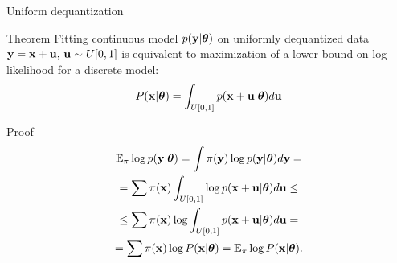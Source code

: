 \begin{frame}{Uniform dequantization}
	\begin{block}{Theorem}
		Fitting continuous model $p(\mathbf{y} | \boldsymbol{\theta})$ on uniformly dequantized data $\mathbf{y} = \mathbf{x} + \mathbf{u}, \, \mathbf{u} \sim U[0, 1]$ is equivalent to maximization of a lower bound on log-likelihood for a discrete model:
		\vspace{-0.2cm}
		\[
		P(\mathbf{x} | \boldsymbol{\theta}) = \int_{U[0, 1]} p(\mathbf{x} + \mathbf{u} | \boldsymbol{\theta}) d \mathbf{u}
		\]
		\vspace{-0.5cm} 
	\end{block}
	\begin{block}{Proof}
		\vspace{-0.8cm}
		\begin{multline*}
			\mathbb{E}_{\pi} \log p(\mathbf{y} | \boldsymbol{\theta}) = \int \pi(\mathbf{y}) \log p(\mathbf{y} | \boldsymbol{\theta}) d \mathbf{y} = \\ 
			= \sum \pi(\mathbf{x}) \int_{U[0,1]} \log p(\mathbf{x} + \mathbf{u} | \boldsymbol{\theta}) d \mathbf{u} \leq \\
			\leq \sum \pi(\mathbf{x}) \log \int_{U[0,1]}  p(\mathbf{x} + \mathbf{u} | \boldsymbol{\theta}) d \mathbf{u} = \\
			= \sum \pi(\mathbf{x}) \log P(\mathbf{x} | \boldsymbol{\theta}) = \mathbb{E}_{\pi} \log P(\mathbf{x} | \boldsymbol{\theta}).
		\end{multline*}
	\end{block}
\end{frame}
